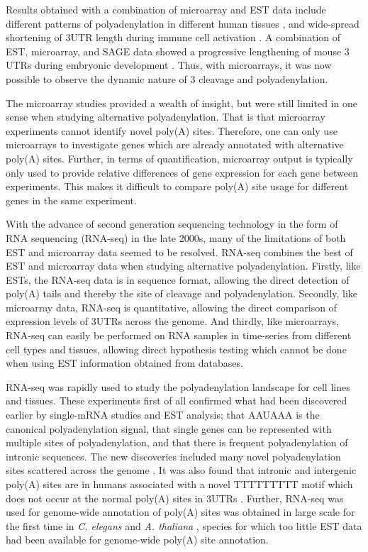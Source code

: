 Results obtained with a combination of microarray and EST data include
different patterns of polyadenylation in different human tissues
\cite{zhang_biased_2005}, and wide-spread shortening of 3\ppp UTR length during
immune cell activation \cite{sandberg_proliferating_2008}. A combination of
EST, microarray, and SAGE data showed a progressive lengthening of mouse 3\ppp
UTRs during embryonic development \cite{ji_progressive_2009}. Thus, with
microarrays, it was now possible to observe the dynamic nature of 3\ppp
cleavage and polyadenylation.

The microarray studies provided a wealth of insight, but were still limited in
one sense when studying alternative polyadenylation. That is that microarray
experiments cannot identify novel poly(A) sites. Therefore, one can only use
microarrays to investigate genes which are already annotated with alternative
poly(A) sites. Further, in terms of quantification, microarray output is
typically only used to provide relative differences of gene expression for each
gene between experiments. This makes it difficult to compare poly(A) site usage
for different genes in the same experiment.

With the advance of second generation sequencing technology in the form of RNA
sequencing (RNA-seq) in the late 2000s, many of the limitations of both EST and
microarray data seemed to be resolved. RNA-seq combines the best of EST and
microarray data when studying alternative polyadenylation. Firstly, like ESTs,
the RNA-seq data is in sequence format, allowing the direct detection of
poly(A) tails and thereby the site of cleavage and polyadenylation. Secondly,
like microarray data, RNA-seq is quantitative, allowing the direct comparison
of expression levels of 3\ppp UTRs across the genome. And thirdly, like
microarrays, RNA-seq can easily be performed on RNA samples in time-series from
different cell types and tissues, allowing direct hypothesis testing which
cannot be done when using EST information obtained from databases. 

RNA-seq was rapidly used to study the polyadenylation landscape for cell lines
and tissues. These experiments first of all confirmed what had been discovered
earlier by single-mRNA studies and EST analysis; that AAUAAA is the canonical
polyadenylation signal, that single genes can be represented with multiple
sites of polyadenylation, and that there is frequent polyadenylation of
intronic sequences. The new discoveries included many novel polyadenylation
sites scattered across the genome \cite{ozsolak_comprehensive_2010,
derti_quantitative_2012}. It was also found that intronic and intergenic
poly(A) sites are in humans associated with a novel TTTTTTTTT motif which does
not occur at the normal poly(A) sites in 3\ppp UTRs
\cite{ozsolak_comprehensive_2010}. Further, RNA-seq was used for genome-wide
annotation of poly(A) sites was obtained in large scale for the first time in
\textit{C. elegans} and \textit{A. thaliana} \cite{mangone_landscape_2010,
wu_genome-wide_2011}, species for which too little EST data had been available
for genome-wide poly(A) site annotation.

